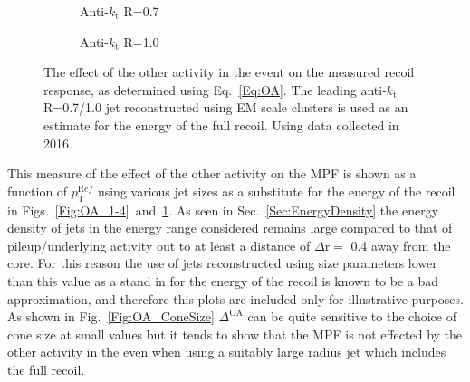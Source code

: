\begin{figure}[!ht]
  \centering
  \begin{subfigure}{.5\textwidth}
    \centering
    \caption{Anti-$k_\mathrm{t}$ R=0.7}
  \end{subfigure}%
  \begin{subfigure}{.5\textwidth}  \centering
    \caption{Anti-$k_\mathrm{t}$ R=1.0}
  \end{subfigure}
  \caption[$\Delta^{\mathrm{OA}}$ using anti-$k_\mathrm{t}$ R=0.7/1.0 jets]
{\small The effect of the other activity in the event on the measured recoil response, as determined using Eq.~\ref{Eq:OA}.  The leading anti-$k_\mathrm{t}$ R=0.7/1.0 jet reconstructed using EM scale clusters is used as an estimate for the energy of the full recoil.  Using data collected in 2016.  }
  \label{Fig:OA_7-10}
\end{figure}

This measure of the effect of the other activity on the MPF is shown as a function of $p_{\mathrm T}^{\mathrm Ref}$ using various jet sizes as a substitute for the energy of the recoil in Figs.~\ref{Fig:OA_1-4}~and~\ref{Fig:OA_7-10}.  
As seen in Sec.~\ref{Sec:EnergyDensity} the energy density of jets in the energy range considered remains large compared to that of pileup/underlying activity out to at least a distance of $\Delta\mathrm{r}=$ 0.4 away from the core.  
For this reason the use of jets reconstructed using size parameters lower than this value as a stand in for the energy of the recoil is known to be a bad approximation, and therefore this plots are included only for illustrative purposes.  
As shown in Fig.~\ref{Fig:OA_ConeSize} $\Delta^{\mathrm{OA}}$ can be quite sensitive to the choice of cone size at small values but it tends to show that the MPF is not effected by the other activity in the even when using a suitably large radius jet which includes the full recoil.  

